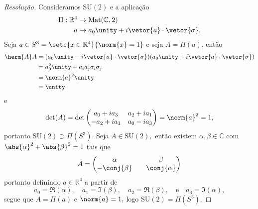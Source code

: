 \begin{proof}[Resolução]
    Consideramos \(\mathrm{SU}(2)\) e a aplicação
    \begin{align*}
        \Pi : \mathbb{R}^4 &\to \mathrm{Mat}(\mathbb{C}, 2)\\
                         a &\mapsto a_0 \unity + i \vetor{a} \cdot \vetor{\sigma}.
    \end{align*}
    Seja \(a \in S^3 = \setc{x \in \mathbb{R}^4}{\norm{x} = 1}\) e seja \(A = \Pi(a)\), então
    \begin{align*}
        \herm{A}A &= (a_0 \unity - i \vetor{a} \cdot \vetor{\sigma}) (a_0 \unity + i \vetor{a} \cdot \vetor{\sigma})\\
                  &= a_0^2 \unity + a_i a_j \sigma_i \sigma_j\\
                  &= \norm{a}^2 \unity\\
                  &= \unity
    \end{align*}
    e
    \begin{equation*}
        \det(A) = \det \begin{pmatrix}
            a_0 + ia_3 & a_2 + ia_1\\
            -a_2 + ia_1& a_0 - ia_3
        \end{pmatrix} = \norm{a}^2 = 1,
    \end{equation*}
    portanto \(\mathrm{SU}(2) \supset \Pi(S^3).\) Seja \(A \in \mathrm{SU}(2),\) então existem \(\alpha, \beta \in \mathbb{C}\) com \(\abs{\alpha}^2 + \abs{\beta}^2 = 1\) tais que
    \begin{equation*}
        A = \begin{pmatrix}
            \alpha && \beta\\
            - \conj{\beta} && \conj{\alpha}
        \end{pmatrix}
    \end{equation*}
    portanto definindo \(a \in \mathbb{R}^4\) a partir de
    \begin{equation*}
        a_0 = \Re(\alpha),\quad
        a_1 = \Im(\beta),\quad
        a_2 = \Re(\beta),\quad\text{e}\quad
        a_3 = \Im(\alpha),
    \end{equation*}
    segue que \(A = \Pi(a)\) e \(\norm{a} = 1,\) logo \(\mathrm{SU}(2) = \Pi(S^3).\) 


\end{proof}
